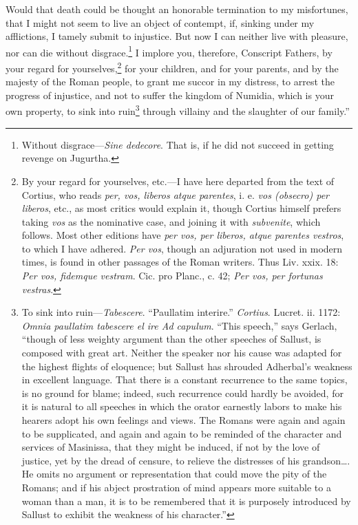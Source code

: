 Would that death could be thought an honorable termination to my
misfortunes, that I might not seem to live an object of contempt, if,
sinking under my afflictions, I tamely submit to injustice. But now I
can neither live with pleasure, nor can die without disgrace.\footnote{Without disgrace—\emph{Sine dedecore}. That is, if he did not succeed
in getting revenge on Jugurtha.} I
implore you, therefore, Conscript Fathers, by your regard for
yourselves,\footnote{By your regard for yourselves, etc.—I have here departed from
the text of Cortius, who reads \emph{per, vos, liberos atque parentes},
i. e. \emph{vos (obsecro) per liberos}, etc., as most critics would explain
it, though Cortius himself prefers taking \emph{vos} as the nominative case,
and joining it with \emph{subvenite}, which follows. Most other editions
have \emph{per vos, per liberos, atque parentes vestros}, to which I have
adhered. \emph{Per vos}, though an adjuration not used in modern times,
is found in other passages of the Roman writers. Thus Liv. xxix. 18:
\emph{Per vos, fidemque vestram}. Cic. pro Planc., c. 42; \emph{Per vos, per
fortunas vestras}.} for your children, and for your parents, and by the
majesty of the Roman people, to grant me succor in my distress, to
arrest the progress of injustice, and not to suffer the kingdom of
Numidia, which is your own property, to sink into ruin\footnote{To sink into ruin—\emph{Tabescere}. ``Paullatim interire.''
\emph{Cortius}. Lucret. ii. 1172: \emph{Omnia paullatim tabescere el ire Ad
capulum}. ``This speech,'' says Gerlach, ``though of less weighty
argument than the other speeches of Sallust, is composed with great
art. Neither the speaker nor his cause was adapted for the highest
flights of eloquence; but Sallust has shrouded Adherbal's weakness in
excellent language. That there is a constant recurrence to the same
topics, is no ground for blame; indeed, such recurrence could hardly
be avoided, for it is natural to all speeches in which the orator
earnestly labors to make his hearers adopt his own feelings and views.
The Romans were again and again to be supplicated, and again and again
to be reminded of the character and services of Masinissa, that they
might be induced, if not by the love of justice, yet by the dread of
censure, to relieve the distresses of his grandson…. He omits no
argument or representation that could move the pity of the Romans; and
if his abject prostration of mind appears more suitable to a woman
than a man, it is to be remembered that it is purposely introduced by
Sallust to exhibit the weakness of his character.''} through
villainy and the slaughter of our family.''

